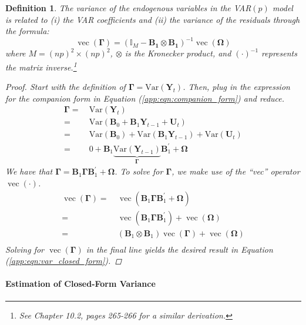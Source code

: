 \documentclass[12pt]{article}
\newtheorem{definition}{Definition}[section]
\DeclareMathOperator{\vect}{vec}
\newcommand{\Var}{\mathrm{Var}}
\begin{document}
\begin{definition}
The variance of the endogenous variables in the VAR$(p)$ model is related to (i) the VAR coefficients and (ii) the variance of the residuals through the formula:
\begin{equation}\label{app:eqn:var_closed_form}
\vect(\mathbf{\Gamma}) = \left(\mathbb{I}_{M}  - \mathbf{B_1} \otimes \mathbf{B_1}\right)^{-1} \vect(\mathbf{\Omega})
\end{equation}
where $M = (np)^2 \times (np)^2$, $\otimes$ is the Kronecker product, and $(\cdot)^{-1}$ represents the matrix inverse.\footnote{See \cite{Hamilton:1994aa} Chapter 10.2, pages 265-266 for a similar derivation.}
\begin{proof}
Start with the definition of $\mathbf{\Gamma} = \Var(\mathbf{Y}_t)$. Then, plug in the expression for the companion form in Equation (\ref{app:eqn:companion_form}) and reduce.
\begin{align*}
\mathbf{\Gamma} = & \ \Var(\mathbf{Y}_t) \\
= & \ \Var(\mathbf{B}_0 + \mathbf{B}_1 \mathbf{Y}_{t-1} + \mathbf{U}_t) \\
= & \ \Var(\mathbf{B}_0) + \Var(\mathbf{B}_1 \mathbf{Y}_{t-1}) + \Var(\mathbf{U}_t) \\
= & \ 0 + \mathbf{B}_1\underbrace{\Var(\mathbf{Y}_{t-1})}_{\mathbf{\Gamma}}\mathbf{B}_1^\prime + \mathbf{\Omega}
\end{align*}
We have that $\mathbf{\Gamma} =  \mathbf{B}_1\mathbf{\Gamma}\mathbf{B}_1^\prime + \mathbf{\Omega}$. To solve for $\mathbf{\Gamma}$, we make use of the ``vec'' operator $\vect(\cdot)$.
\begin{align*}
\vect(\mathbf{\Gamma}) = & \ \vect(\mathbf{B}_1\mathbf{\Gamma}\mathbf{B}_1^\prime + \mathbf{\Omega}) \\
= & \ \vect(\mathbf{B}_1\mathbf{\Gamma}\mathbf{B}_1^\prime) + \vect(\mathbf{\Omega}) \\
= & \ (\mathbf{B}_1 \otimes \mathbf{B}_1)\vect(\mathbf{\Gamma}) + \vect(\mathbf{\Omega}) \\
\end{align*}
Solving for $\vect(\mathbf{\Gamma})$ in the final line yields the desired result in Equation (\ref{app:eqn:var_closed_form}).
\end{proof}
\end{definition}

\paragraph{Estimation of Closed-Form Variance}
\end{document}
